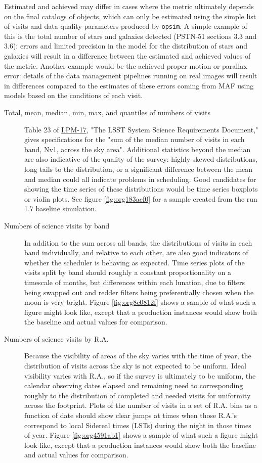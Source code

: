 Estimated and achieved may differ in cases where the metric ultimately depends on the final catalogs of objects, which can only be estimated using the simple list of visits and data quality parameters produced by \texttt{opsim}.
A simple example of this is the total number of stars and galaxies detected (PSTN-51 sections 3.3 and 3.6): errors and limited precision in the model for the distribution of stars and galaxies will result in a difference between the estimated and achieved values of the metric. Another example would be the achieved proper motion or parallax error: details of the data management pipelines running on real images will result in differences compared to the estimates of these errors coming from MAF using models based on the conditions of each visit.

\begin{description}
\item[{Total, mean, median, min, max, and quantiles of numbers of visits}] Table 23 of \href{http://ls.st/lpm-17}{LPM-17}, "The LSST System Science Requirements Document," gives specifications for the "sum of the median number of visits in each band, Nv1, across the sky area". Additional statistics beyond the median are also indicative of the quality of the survey: highly skewed distributions, long tails to the distribution, or a significant difference between the mean and median could all indicate problems in scheduling. Good candidates for showing the time series of these distributions would be time series boxplots or violin plots. See figure \ref{fig:org183acf0} for a sample created from the run 1.7 baseline simulation.
\item[{Numbers of science visits by band}] In addition to the sum across all bands, the distributions of visits in each band individually, and relative to each other, are also good indicators of whether the scheduler is behaving as expected. Time series plots of the visits split by band should roughly a constant proportionality on a timescale of months, but differences within each lunation, due to filters being swapped out and redder filters being preferentially chosen when the moon is very bright. Figure \ref{fig:org8c0812f} shows a sample of what such a figure might look like, except that a production instances would show both the baseline and actual values for comparison.
\item[{Numbers of science visits by R.A.}] Because the visibility of areas of the sky varies with the time of year, the distribution of visits across the sky is not expected to be uniform. Ideal visibility varies with R.A., so if the survey is ultimately to be uniform, the calendar observing dates elapsed and remaining need to corresponding roughly to the distribution of completed and needed visits for uniformity across the footprint. Plots of the number of visits in a set of R.A. bins as a function of date should show clear jumps at times when those R.A.'s correspond to local Sidereal times (LSTs) during the night in those times of year. Figure \ref{fig:org4591ab1} shows a sample of what such a figure might look like, except that a production instances would show both the baseline and actual values for comparison.

\end{description}
